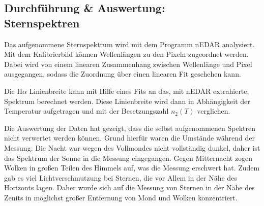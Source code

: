 \subsection{Durchführung \& Auswertung:\\Sternspektren}
Das aufgenommene Sternspektrum wird mit dem Programm nEDAR analysiert.
Mit dem Kalibrierbild können Wellenlängen zu den Pixeln zugeordnet werden.
Dabei wird von einem linearen Zusammenhang zwischen Wellenlänge und Pixel ausgegangen, sodass die Zuordnung über einen linearen Fit geschehen kann.

Die H$\alpha $ Linienbreite kann mit Hilfe eines Fits an das, mit nEDAR extrahierte, Spektrum berechnet werden.
Diese Linienbreite wird dann in Abhängigkeit der Temperatur aufgetragen und mit der Besetzungszahl $n_2\left(T\right)$ verglichen.

Die Auswertung der Daten hat gezeigt, dass die selbst aufgenommenen Spektren nicht verwertet werden können.
Grund hierfür waren die Umstände während der Messung.
Die Nacht war wegen des Vollmondes nicht vollständig dunkel, daher ist das Spektrum der Sonne in die Messung eingegangen.
Gegen Mitternacht zogen Wolken in großen Teilen des Himmels auf, was die Messung erschwert hat.
Zudem gab es viel Lichtverschmutzung bei Sternen, die vor Allem in der Nähe des Horizonts lagen.
Daher wurde sich auf die Messung von Sternen in der Nähe des Zenits in möglichst großer Entfernung von Mond und Wolken konzentriert.
